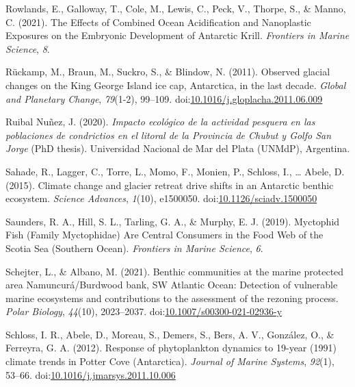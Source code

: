 \documentclass[
]{article}
\newlength{\cslhangindent}
\newlength{\cslentryspacingunit} %
\newenvironment{CSLReferences}[2] %
 {%
  \setlength{\parindent}{0pt}
  \ifodd #1
  \let\oldpar\par
  \def\par{\hangindent=\cslhangindent\oldpar}
  \fi
  \setlength{\parskip}{#2\cslentryspacingunit}
 }%
 {}
\begin{document}
\begin{CSLReferences}{1}{0}
\leavevmode{}%
Rowlands, E., Galloway, T., Cole, M., Lewis, C., Peck, V., Thorpe, S.,
\& Manno, C. (2021). The {Effects} of {Combined Ocean Acidification} and
{Nanoplastic Exposures} on the {Embryonic Development} of {Antarctic
Krill}. \emph{Frontiers in Marine Science}, \emph{8}.

\leavevmode{}%
Rückamp, M., Braun, M., Suckro, S., \& Blindow, N. (2011). Observed
glacial changes on the {King George Island} ice cap, {Antarctica}, in
the last decade. \emph{Global and Planetary Change}, \emph{79}(1-2),
99--109.
doi:\href{https://doi.org/10.1016/j.gloplacha.2011.06.009}{10.1016/j.gloplacha.2011.06.009}

\leavevmode{}%
Ruibal Nuñez, J. (2020). \emph{{Impacto ecológico de la actividad
pesquera en las poblaciones de condrictios en el litoral de la Provincia
de Chubut y Golfo San Jorge}} (PhD thesis). Universidad Nacional de Mar
del Plata (UNMdP), {Argentina}.

\leavevmode{}%
Sahade, R., Lagger, C., Torre, L., Momo, F., Monien, P., Schloss, I.,
\ldots{} Abele, D. (2015). Climate change and glacier retreat drive
shifts in an {Antarctic} benthic ecosystem. \emph{Science Advances},
\emph{1}(10), e1500050.
doi:\href{https://doi.org/10.1126/sciadv.1500050}{10.1126/sciadv.1500050}

\leavevmode{}%
Saunders, R. A., Hill, S. L., Tarling, G. A., \& Murphy, E. J. (2019).
Myctophid {Fish} ({Family Myctophidae}) {Are Central Consumers} in the
{Food Web} of the {Scotia Sea} ({Southern Ocean}). \emph{Frontiers in
Marine Science}, \emph{6}.

\leavevmode{}%
Schejter, L., \& Albano, M. (2021). Benthic communities at the marine
protected area {Namuncurá}/{Burdwood} bank, {SW Atlantic Ocean}:
Detection of vulnerable marine ecosystems and contributions to the
assessment of the rezoning process. \emph{Polar Biology}, \emph{44}(10),
2023--2037.
doi:\href{https://doi.org/10.1007/s00300-021-02936-y}{10.1007/s00300-021-02936-y}

\leavevmode{}%
Schloss, I. R., Abele, D., Moreau, S., Demers, S., Bers, A. V.,
González, O., \& Ferreyra, G. A. (2012). Response of phytoplankton
dynamics to 19-year (1991) climate trends in {Potter
Cove} ({Antarctica}). \emph{Journal of Marine Systems}, \emph{92}(1),
53--66.
doi:\href{https://doi.org/10.1016/j.jmarsys.2011.10.006}{10.1016/j.jmarsys.2011.10.006}


\end{CSLReferences}
\end{document}
